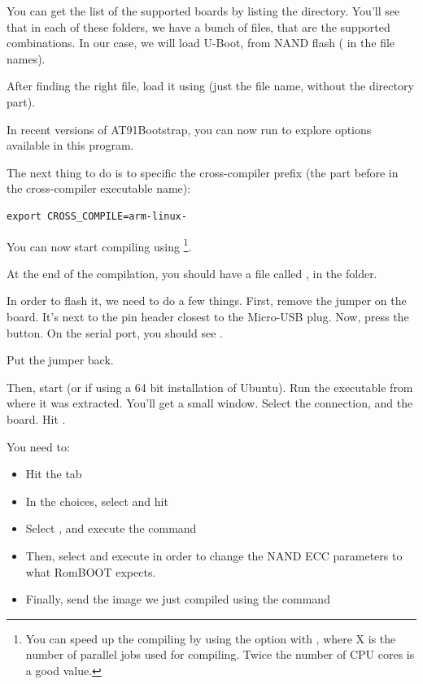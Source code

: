 You can get the list of the supported boards by listing the
 directory. You'll see that in each of these folders, we
have a bunch of  files, that are the supported
combinations. In our case, we will load U-Boot, from NAND flash
( in the  file names).

After finding the right  file, load it using
 (just the file name, without
the directory part).

In recent versions of AT91Bootstrap, you can now run  to explore options available in this program. 

The next thing to do is to specific the cross-compiler prefix
(the part before  in the cross-compiler executable name):

\begin{verbatim}
export CROSS_COMPILE=arm-linux-
\end{verbatim}

You can now start compiling using \footnote{You can
speed up the compiling by using the  option with
, where X is the number of parallel jobs used for
compiling. Twice the number of CPU cores is a good value.}.

At the end of the compilation, you should have a file called
, in the
 folder.

In order to flash it, we need to do a few things. First, remove the
 jumper on the board. It's next to the pin header
closest to the Micro-USB plug. Now, press the  button.
On the serial port, you should see .

Put the jumper back.

Then, start  (or  if using a 64 bit
installation of Ubuntu). Run the executable from where it was
extracted. You'll get a small window. Select the 
connection, and the  board. Hit .

You need to:
\begin{itemize}
\item Hit the  tab
\item In the  choices, select 
      and hit 
\item Select , and execute the command
\item Then, select and execute 
  in order to change the NAND ECC parameters to what RomBOOT expects.
\item Finally, send the image we just compiled using the command
\end{itemize}

